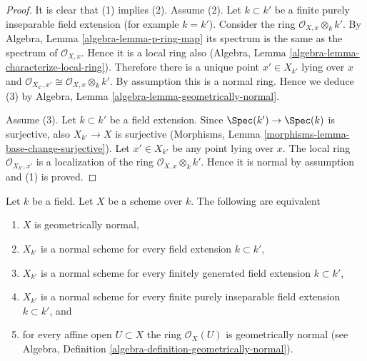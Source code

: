 \begin{proof}
It is clear that (1) implies (2). Assume (2). Let $k \subset k'$ be a finite
purely inseparable field extension (for example $k = k'$). Consider the ring
$\mathcal{O}_{X, x} \otimes_k k'$.
By Algebra, Lemma \ref{algebra-lemma-p-ring-map}
its spectrum is the same as the spectrum of $\mathcal{O}_{X, x}$.
Hence it is a local ring also
(Algebra, Lemma \ref{algebra-lemma-characterize-local-ring}).
Therefore there is a unique point $x' \in X_{k'}$ lying over $x$
and $\mathcal{O}_{X_{k'}, x'} \cong \mathcal{O}_{X, x} \otimes_k k'$.
By assumption this is a normal ring. Hence we deduce (3) by
Algebra, Lemma
\ref{algebra-lemma-geometrically-normal}.

\medskip\noindent
Assume (3). Let $k \subset k'$ be a field extension. Since
$\Spec(k') \to \Spec(k)$ is surjective, also
$X_{k'} \to X$ is surjective
(Morphisms, Lemma \ref{morphisms-lemma-base-change-surjective}).
Let $x' \in X_{k'}$ be any point lying over $x$.
The local ring $\mathcal{O}_{X_{k'}, x'}$
is a localization of the ring $\mathcal{O}_{X, x} \otimes_k k'$.
Hence it is normal by assumption and (1) is proved.
\end{proof}

\begin{lemma}
\label{lemma-geometrically-normal}
Let $k$ be a field.
Let $X$ be a scheme over $k$.
The following are equivalent
\begin{enumerate}
\item $X$ is geometrically normal,
\item $X_{k'}$ is a normal scheme for every field extension $k \subset k'$,
\item $X_{k'}$ is a normal scheme for every finitely generated field
extension $k \subset k'$,
\item $X_{k'}$ is a normal scheme for every finite purely inseparable
field extension $k \subset k'$, and
\item for every affine open $U \subset X$ the ring $\mathcal{O}_X(U)$
is geometrically normal (see
Algebra, Definition \ref{algebra-definition-geometrically-normal}).
\end{enumerate}
\end{lemma}

